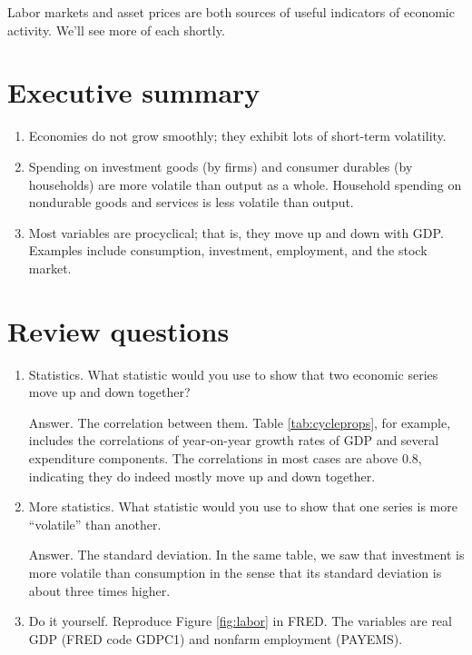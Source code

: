 Labor markets and asset prices are
both sources of useful indicators of economic activity.
We'll see more of each shortly.


\section*{Executive summary}

\begin{enumerate}
\item Economies do not grow smoothly; they exhibit lots of
short-term volatility.

\item Spending on investment goods (by firms)
and consumer durables (by households) are more volatile
 than output as a whole.
 Household spending on nondurable goods and services
 is less volatile than output.

\item Most variables are procyclical; that is, they move up and down with GDP.
Examples include consumption, investment, employment, and the stock market.
\end{enumerate}


\section*{Review questions}

\begin{enumerate}
\item Statistics.  What statistic would you use to show that two economic series
move up and down together?

Answer.  The correlation between them.
Table \ref{tab:cycleprops}, for example, includes the correlations
of year-on-year growth rates of GDP and several expenditure components.
The correlations in most cases are above 0.8, indicating they do indeed
mostly move up and down together.

\item More statistics.  What statistic would you use
 to show that one series is more ``volatile''
than another.

Answer.  The standard deviation.
In the same table, we saw that investment is more volatile than consumption
in the sense that its standard deviation is about three times higher.

\item Do it yourself.  Reproduce Figure \ref{fig:labor} in FRED.
The variables are real GDP (FRED code GDPC1) and nonfarm employment
(PAYEMS).
\end{enumerate}

